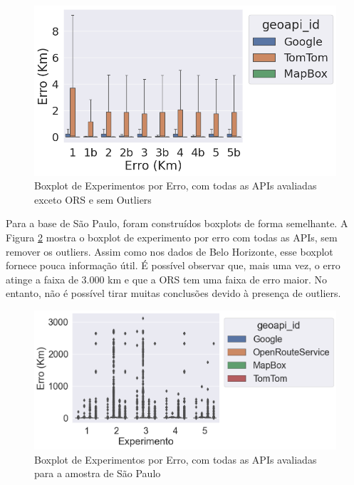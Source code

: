 \begin{figure}[h]
    \centering
    \includegraphics[width=\textwidth]{Figuras/boxplotExperimentoSemOutSemORS.png}
    \caption{Boxplot de Experimentos por Erro, com todas as APIs avaliadas exceto ORS e sem Outliers}
    \label{fig:boxplot-semors-semout-bh}
\end{figure}

Para a base de São Paulo, foram construídos boxplots de forma semelhante. A Figura \ref{fig:boxplot-completo-sp} mostra o boxplot de experimento por erro com todas as APIs, sem remover os outliers. Assim como nos dados de Belo Horizonte, esse boxplot fornece pouca informação útil. É possível observar que, mais uma vez, o erro atinge a faixa de 3.000 km e que a ORS tem uma faixa de erro maior. No entanto, não é possível tirar muitas conclusões devido à presença de outliers.

\begin{figure}[h]
    \centering
    \includegraphics[width=\textwidth]{Figuras/boxplotExperimentoSP.png}
    \caption{Boxplot de Experimentos por Erro, com todas as APIs avaliadas para a amostra de São Paulo}
    \label{fig:boxplot-completo-sp}
\end{figure}

